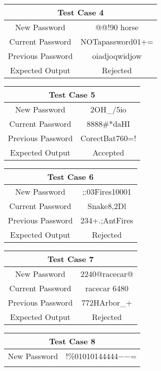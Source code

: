 \documentclass[12pt,letterpaper]{article}
\begin{document}
\begin{table}[h]
\begin{centering}
\begin{tabular}{||c|c||}
  \hline
  \end{tabular}
  \begin{tabular}{||c|c||}
  \hline
  \multicolumn{2}{||c||}{Test Case 4} \\
  \hline
  New Password & @@!90 horse \\
  \hline
  Current Password & NOTapassword01+= \\
  \hline
  Previous Password & oiadjoqwidjow \\
  \hline
  Expected Output & Rejected \\
  \hline
  \end{tabular}
  \begin{tabular}{||c|c||}
  \hline
  \multicolumn{2}{||c||}{Test Case 5} \\
  \hline
  New Password & 2OH\_/5io \\
  \hline
  Current Password & 8888\#*daHI\\
  \hline
  Previous Password & CorectBat760=! \\
  \hline
  Expected Output & Accepted \\
  \hline
  \end{tabular}
  \begin{tabular}{||c|c||}
  \hline
  \multicolumn{2}{||c||}{Test Case 6} \\
  \hline
  New Password &  ;:03Fires10001 \\
  \hline
  Current Password & Snake8,2Dl \\
  \hline
  Previous Password & 234+.;AntFires \\
  \hline
  Expected Output & Rejected \\
  \hline
  \end{tabular}
  \begin{tabular}{||c|c||}
  \hline
  \multicolumn{2}{||c||}{Test Case 7} \\
  \hline
  New Password & 2240@racecar@ \\
  \hline
  Current Password & racecar 6480 \\
  \hline
  Previous Password & 772HArbor\_+ \\
  \hline
  Expected Output & Rejected \\
  \hline
  \end{tabular}
  \begin{tabular}{||c|c||}
  \hline
  \multicolumn{2}{||c||}{Test Case 8} \\
  \hline
  New Password & !\%01010144444$-$$-$= \\
$$
\end{tabular}
\end{centering}
\end{table}
\end{document}
